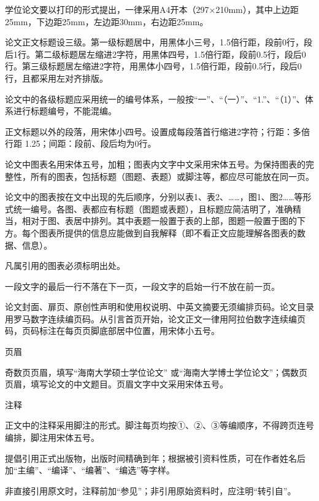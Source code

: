 \documentclass{hnuthesis}%
\begin{document}
\begin{asparaenum}
\item 学位论文要以打印的形式提出，一律采用A4开本（297×210mm），其中上边距25mm，下边距25mm，左边距30mm，右边距25mm。
\item 论文正文标题设三级。第一级标题居中，用黑体小三号，1.5倍行距，段前0行，段后1行。第二级标题居左缩进2字符，用黑体四号，1.5倍行距，段前0.5行，段后0行。第三级标题居左缩进2字符，用黑体小四号，1.5倍行距，段前0.5行，段后0行，且都采用左对齐排版。

论文中的各级标题应采用统一的编号体系，一般按“一”、“（一）”、“1.”、“（1）”、体系进行标题编号，不能混编。

\item 正文标题以外的段落，用宋体小四号。设置成每段落首行缩进2字符；行距：多倍行距 1.25；间距：段前、段后均为0行。

\item 论文中图表名用宋体五号，加粗；图表内文字中文采用宋体五号。为保持图表的完整性，所有的图表，包括标题（图题、表题）或脚注等，都应尽可能放在同一页。

论文中的图表按在文中出现的先后顺序，分别以表1、表2、……，图1、图2……等形式统一编号。各图、表都应有标题（图题或表题），且标题应简洁明了，准确精当，相对于图、表居中排列。其中表题一般置于表的上部，图题一般置于图的下方。每个图表所提供的信息应能做到自我解释（即不看正文应能理解各图表的数据、信息）。

凡属引用的图表必须标明出处。

\item 一段文字的最后一行不落在下一页，一段文字的启始一行不放在前一页。

\item 论文封面、扉页、原创性声明和使用权说明、中英文摘要无须编排页码。论文目录用罗马数字连续编页码。从引言首页开始，论文正文一律用阿拉伯数字连续编页码，页码标注在每页页脚底部居中位置，用宋体小五号。

\item 页眉

奇数页页眉，填写“海南大学硕士学位论文” 或“海南大学博士学位论文”；偶数页页眉，填写论文的中文题目。页眉文字中文采用宋体五号。

\item 注释

正文中的注释采用脚注的形式。脚注每页均按①、②、③等编顺序，不得跨页连号编排，脚注用宋体五号。

提倡引用正式出版物，出版时间精确到年；根据被引资料性质，可在作者姓名后加“主编”、“编译”、“编著”、“编选”等字样。

非直接引用原文时，注释前加“参见”；非引用原始资料时，应注明“转引自”。


\end{asparaenum}
\end{document}
